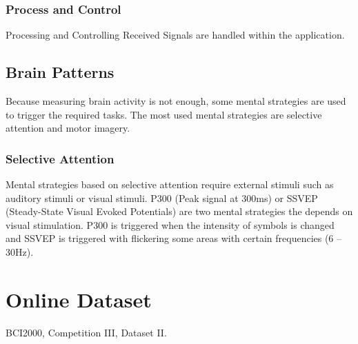 \subsubsection{Process and Control}
Processing and Controlling Received Signals are handled within the application.

\subsection{Brain Patterns}
Because measuring brain activity is not enough, some mental strategies are used to trigger the required tasks. The most used mental strategies are selective attention and motor imagery.
\subsubsection{Selective Attention}
Mental strategies based on selective attention require external stimuli such as auditory stimuli or visual stimuli. P300 (Peak signal at 300ms) or SSVEP (Steady-State Visual Evoked Potentials) are two mental strategies the depends on visual stimulation. P300 is triggered when the intensity of symbols is changed and SSVEP is triggered with flickering some areas with certain frequencies (6 – 30Hz).


\section{Online Dataset}
BCI2000, Competition III, Dataset II.

